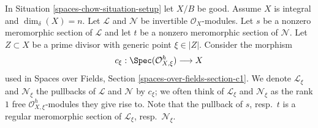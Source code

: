 \medskip\noindent
In Situation \ref{spaces-chow-situation-setup} let $X/B$ be good. Assume $X$ is integral
and $\dim_\delta(X) = n$. Let $\mathcal{L}$ and $\mathcal{N}$ be invertible
$\mathcal{O}_X$-modules. Let $s$ be a nonzero meromorphic section of
$\mathcal{L}$ and let $t$ be a nonzero meromorphic section of $\mathcal{N}$.
Let $Z \subset X$ be a prime divisor with generic point $\xi \in |Z|$.
Consider the morphism
$$
c_\xi : \Spec(\mathcal{O}_{X, \xi}^h) \longrightarrow X
$$
used in Spaces over Fields, Section \ref{spaces-over-fields-section-c1}.
We denote $\mathcal{L}_\xi$ and $\mathcal{N}_\xi$ the pullbacks
of $\mathcal{L}$ and $\mathcal{N}$ by $c_\xi$; we often think of
$\mathcal{L}_\xi$ and $\mathcal{N}_\xi$ as the rank $1$ free
$\mathcal{O}_{X, \xi}^h$-modules they give rise to.
Note that the pullback of $s$, resp.\ $t$ is a regular meromorphic
section of $\mathcal{L}_\xi$, resp.\ $\mathcal{N}_\xi$.

